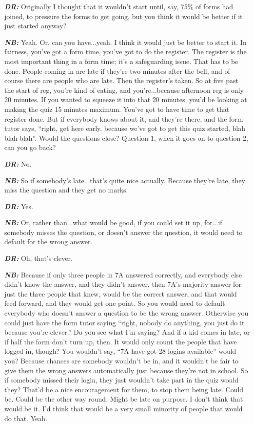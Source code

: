 \textit{\textbf{DR:}} Originally I thought that it wouldn't start until, say, 75\% of forms had joined, to pressure the forms to get going, but you think it would be better if it just started anyway?

\textit{\textbf{NB:}} Yeah. Or, can you have...yeah. I think it would just be better to start it. In fairness, you've got a form time, you've got to do the register. The register is the most important thing in a form time; it's a safeguarding issue. That has to be done. People coming in are late if they're two minutes after the bell, and of course there are people who are late. Then the register's taken. So at five past the start of reg, you're kind of eating, and you're...because afternoon reg is only 20 minutes. If you wanted to squeeze it into that 20 minutes, you'd be looking at making the quiz 15 minutes maximum. You've got to have time to get that register done. But if everybody knows about it, and they're there, and the form tutor says, ``right, get here early, because we've got to get this quiz started, blah blah blah''. Would the questions close? Question 1, when it goes on to question 2, can you go back?

\textit{\textbf{DR:}} No.

\textit{\textbf{NB:}} So if somebody's late...that's quite nice actually. Because they're late, they miss the question and they get no marks. 

\textit{\textbf{DR:}} Yes.

\textit{\textbf{NB:}} Or, rather than...what would be good, if you could set it up, for...if somebody misses the question, or doesn't answer the question, it would need to default for the wrong answer.

\textit{\textbf{DR:}} Oh, that's clever.

\textit{\textbf{NB:}} Because if only three people in 7A answered correctly, and everybody else didn't know the answer, and they didn't answer, then 7A's majority answer for just the three people that knew, would be the correct answer, and that would feed forward, and they would get one point. So you would need to default everybody who doesn't answer a question to be the wrong answer. Otherwise you could just have the form tutor saying ``right, nobody do anything, you just do it because you're clever.'' Do you see what I'm saying? And if a kid comes in late, or if half the form don't turn up, then. It would only count the people that have logged in, though? You wouldn't say, ``7A have got 28 logins available'' would you? Because chances are somebody wouldn't be in, and it wouldn't be fair to give them the wrong answers automatically just because they're not in school. So if somebody missed their login, they just wouldn't take part in the quiz would they? That'd be a nice encouragement for them, to stop them being late. Could be. Could be the other way round. Might be late on purpose. I don't think that would be it. I'd think that would be a very small minority of people that would do that. Yeah.

